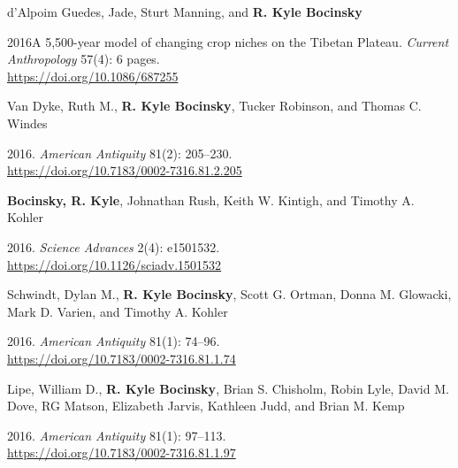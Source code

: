 d'Alpoim Guedes, Jade, Sturt Manning, and {\bf R. Kyle Bocinsky}
\begin{list1}
\item[] 2016\hspace{.2cm}A 5,500-year model of changing crop niches on the Tibetan Plateau. \emph{Current Anthropology} 57(4): 6 pages.\\\href{https://doi.org/10.1086/687255}{https://doi.org/10.1086/687255}
\end{list1}


Van Dyke, Ruth M., {\bf R. Kyle Bocinsky}, Tucker Robinson, and Thomas C. Windes
\begin{list1}
\item[] 2016\hspace{.2cm}{Great houses, shrines, and high places: Intervisibility in the Chacoan World}. \emph{American Antiquity} 81(2): 205–230.\\\href{https://doi.org/10.7183/0002-7316.81.2.205}{https://doi.org/10.7183/0002-7316.81.2.205}
\end{list1}


{\bf Bocinsky, R. Kyle}, Johnathan Rush, Keith W. Kintigh, and Timothy A. Kohler
\begin{list1}
\item[] 2016\hspace{.2cm}{Exploration and exploitation in the macrohistory of the pre-Hispanic Pueblo Southwest}. \emph{Science Advances} 2(4): e1501532.\\\href{https://doi.org/10.1126/sciadv.1501532}{https://doi.org/10.1126/sciadv.1501532}
\end{list1}


Schwindt, Dylan M., {\bf R. Kyle Bocinsky}, Scott G. Ortman, Donna M. Glowacki, Mark D. Varien, and Timothy A. Kohler
\begin{list1}
\item[] 2016\hspace{.2cm}{The social consequences of climate change in the Central Mesa Verde region}. \emph{American Antiquity} 81(1): 74–96.\\\href{https://doi.org/10.7183/0002-7316.81.1.74}{https://doi.org/10.7183/0002-7316.81.1.74}
\end{list1}


Lipe, William D., {\bf R. Kyle Bocinsky}, Brian S. Chisholm, Robin Lyle, David M. Dove, RG Matson, Elizabeth Jarvis, Kathleen Judd, and Brian M. Kemp
\begin{list1}
\item[] 2016. \emph{American Antiquity} 81(1): 97–113.\\\href{https://doi.org/10.7183/0002-7316.81.1.97}{https://doi.org/10.7183/0002-7316.81.1.97}
\end{list1}


